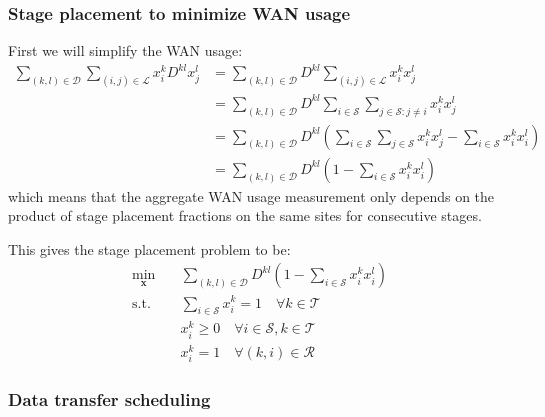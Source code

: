 \subsubsection{Stage placement to minimize WAN usage}
First we will simplify the WAN usage:
\begin{align}
	\sum_{(k,l)\in\mathcal{D}}\sum_{(i,j)\in\mathcal{L}}x_i^kD^{kl}x_j^l & = \sum_{(k,l)\in\mathcal{D}}D^{kl}\sum_{(i,j)\in\mathcal{L}}x_i^kx_j^l \nonumber\\
	& = \sum_{(k,l)\in\mathcal{D}}D^{kl}\sum_{i\in\mathcal{S}}\sum_{j\in\mathcal{S}:j\neq i}x_i^kx_j^l \nonumber\\
	& = \sum_{(k,l)\in\mathcal{D}}D^{kl}\left(\sum_{i\in\mathcal{S}}\sum_{j\in\mathcal{S}}x_i^kx_j^l-\sum_{i\in\mathcal{S}}x_i^kx_i^l\right) \nonumber\\
	& = \sum_{(k,l)\in\mathcal{D}}D^{kl}\left(1-\sum_{i\in\mathcal{S}}x_i^kx_i^l\right)
\end{align}
which means that the aggregate WAN usage measurement only depends on the product of stage placement fractions on the same sites for consecutive stages.

This gives the stage placement problem to be:
\begin{subequations}
	\begin{align}
		\min_{\mathbf{x}} \quad & \sum_{(k,l)\in\mathcal{D}}D^{kl}\left(1-\sum_{i\in\mathcal{S}}x_i^kx_i^l\right) \\
		\text{s.t.} \quad & \sum_{i\in\mathcal{S}}x_i^k = 1 \quad \forall k\in\mathcal{T} \\
		& x_i^k \geq 0 \quad \forall i\in\mathcal{S},k\in\mathcal{T} \\
		& x_i^k = 1 \quad \forall (k,i)\in\mathcal{R}
	\end{align}
\end{subequations}

\subsubsection{Data transfer scheduling}


